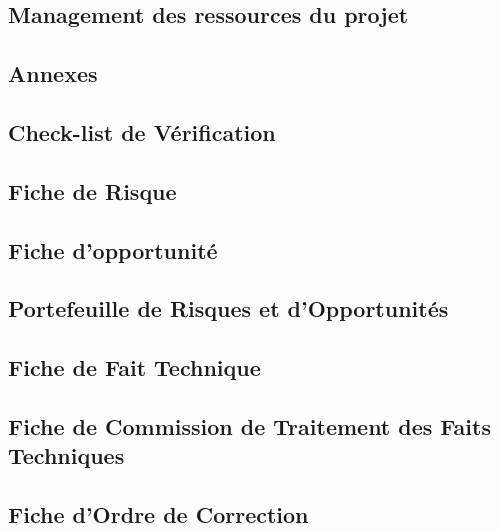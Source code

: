 \documentclass[asi]{picINSA}
\begin{document}
\chapter{Management des ressources du projet}
\label{ressources}

 
\begin{appendix}
\part*{Annexes}

\chapter{Check-list de Vérification}
\label{annexeCheckList}



\chapter{Fiche de Risque}
\label{annexeFRi}


\chapter{Fiche d'opportunité}
\label{annexeFO}


\chapter{Portefeuille de Risques et d'Opportunités}


\chapter{Fiche de Fait Technique}
\label{annexeFFT}


\chapter{Fiche de Commission de Traitement des Faits Techniques}
\label{annexeFCTFT}


\chapter{Fiche d'Ordre de Correction}
\label{annexeFOC}



\end{appendix}
\end{document}
